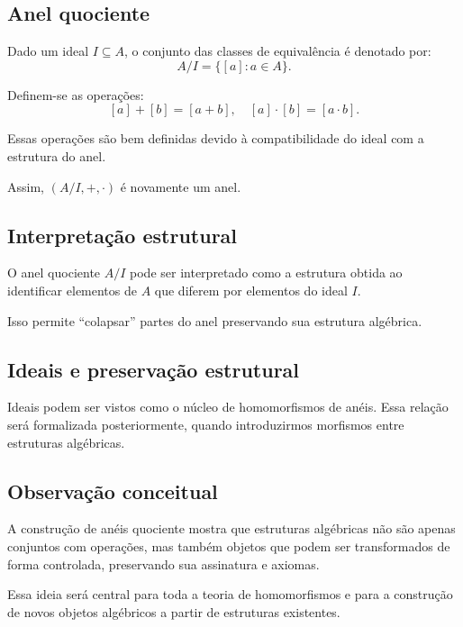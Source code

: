 \documentclass[../../main]{subfiles}
\begin{document}
\subsection{Anel quociente}

Dado um ideal $I \subseteq A$, o conjunto das classes de equivalência é denotado por:
\[
	A/I = \{[a] : a \in A\}.
\]

Definem-se as operações:
\[
	[a] + [b] = [a+b], \quad [a]\cdot[b] = [a \cdot b].
\]

Essas operações são bem definidas devido à compatibilidade do ideal com a estrutura do anel.

Assim, $(A/I, +, \cdot)$ é novamente um anel.

\subsection{Interpretação estrutural}

O anel quociente $A/I$ pode ser interpretado como a estrutura obtida ao identificar elementos de $A$ que diferem por elementos do ideal $I$.

Isso permite “colapsar” partes do anel preservando sua estrutura algébrica.

\subsection{Ideais e preservação estrutural}

Ideais podem ser vistos como o núcleo de homomorfismos de anéis. Essa relação será formalizada posteriormente, quando introduzirmos morfismos entre estruturas algébricas.

\subsection{Observação conceitual}

A construção de anéis quociente mostra que estruturas algébricas não são apenas conjuntos com operações, mas também objetos que podem ser transformados de forma controlada, preservando sua assinatura e axiomas.

Essa ideia será central para toda a teoria de homomorfismos e para a construção de novos objetos algébricos a partir de estruturas existentes.
\end{document}
